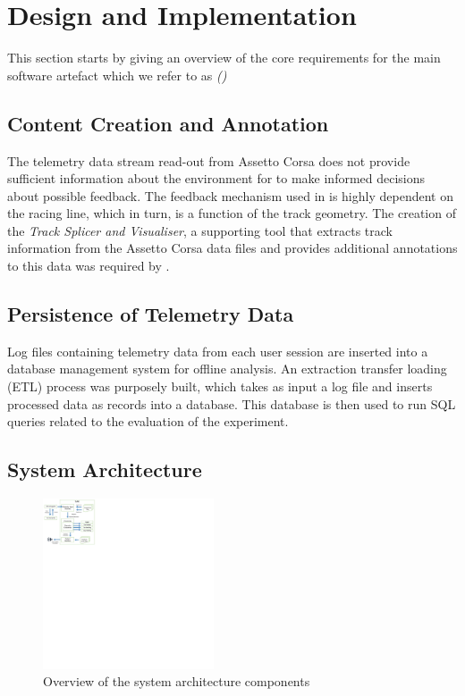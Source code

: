 \documentclass{sig-alternate}
\begin{document}
{\section{Design and Implementation}
\label{sec:DesignImplementation}

This section starts by giving an overview of the core requirements for the main software artefact which we refer to as \emph{\methodnamefull (\methodname)}

\subsection{Content Creation and Annotation}
The telemetry data stream read-out from Assetto Corsa does not provide sufficient information about the environment for \methodname to make informed decisions about possible feedback. The feedback mechanism used in \methodname is highly dependent on the racing line, which in turn, is a function of the track geometry. The creation of the \emph{Track Splicer and Visualiser}, a supporting tool that extracts track information from the Assetto Corsa data files and provides additional annotations to this data was required by \methodname.

\subsection{Persistence of Telemetry Data}
Log files containing telemetry data from each user session are inserted into a database management system for offline analysis. An extraction transfer loading (ETL\cite{kimball2004data}) process was purposely built, which takes as input a log file and inserts processed data as records into a database. This database is then used to run SQL queries related to the evaluation of the experiment.

\subsection{System Architecture}

\begin{figure}[!htb]
	\centering
	\includegraphics[width=0.45\textwidth]{diagrams/SystemArch}
	\caption{Overview of the system architecture components}
	\label{fig:SystemArch}
\end{figure}

}
\end{document}
